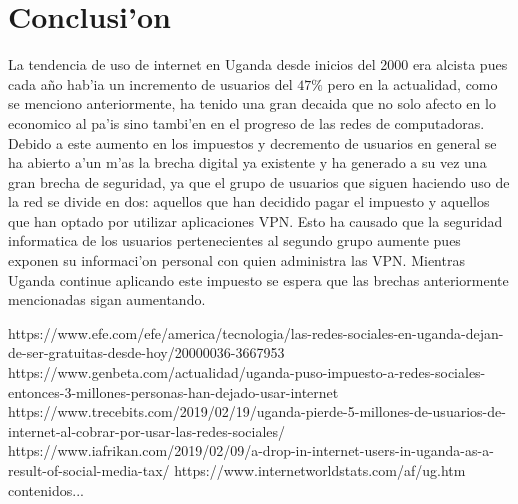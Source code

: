 \documentclass{article}
\begin{document}
	\section{Conclusi'on}
		\large{
			La tendencia de uso de internet en Uganda desde inicios del 2000 era alcista pues cada año hab'ia un incremento de usuarios del $47\%$ pero en la actualidad, como se menciono anteriormente, ha tenido una gran decaida que no solo afecto en lo economico al pa'is sino tambi'en en el progreso de las redes de computadoras. Debido a este aumento en los impuestos y decremento de usuarios en general se ha abierto a'un m'as la brecha digital ya existente y ha generado a su vez una gran brecha de seguridad, ya que el grupo de usuarios que siguen haciendo uso de la red se divide en dos: aquellos que han decidido pagar el impuesto y aquellos que han optado por utilizar aplicaciones VPN. Esto ha causado que la seguridad informatica de los usuarios pertenecientes al segundo grupo aumente pues exponen su informaci'on personal con quien administra las VPN. Mientras Uganda continue aplicando este impuesto se espera que las brechas anteriormente mencionadas sigan aumentando.
		}
	\begin{thebibliography}{00}
		 https://www.efe.com/efe/america/tecnologia/las-redes-sociales-en-uganda-dejan-de-ser-gratuitas-desde-hoy/20000036-3667953 
		 https://www.genbeta.com/actualidad/uganda-puso-impuesto-a-redes-sociales-entonces-3-millones-personas-han-dejado-usar-internet
		 https://www.trecebits.com/2019/02/19/uganda-pierde-5-millones-de-usuarios-de-internet-al-cobrar-por-usar-las-redes-sociales/
		 https://www.iafrikan.com/2019/02/09/a-drop-in-internet-users-in-uganda-as-a-result-of-social-media-tax/
		 https://www.internetworldstats.com/af/ug.htm
		contenidos...
	\end{thebibliography}
\end{document}
